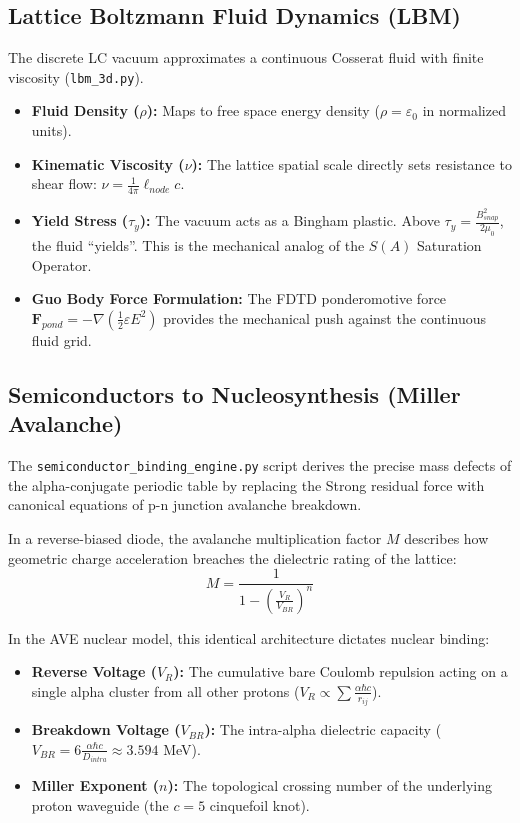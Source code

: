\subsection{Lattice Boltzmann Fluid Dynamics (LBM)}
\label{sec:ee_fluids}
The discrete LC vacuum approximates a continuous Cosserat fluid with finite viscosity (\texttt{lbm\_3d.py}).
\begin{itemize}
    \item \textbf{Fluid Density ($\rho$):} Maps to free space energy density ($\rho = \varepsilon_0$ in normalized units).
    \item \textbf{Kinematic Viscosity ($\nu$):} The lattice spatial scale directly sets resistance to shear flow: $\nu = \frac{1}{4\pi}\ell_{node}c$.
    \item \textbf{Yield Stress ($\tau_y$):} The vacuum acts as a Bingham plastic. Above $\tau_y = \frac{B_{snap}^2}{2\mu_0}$, the fluid ``yields''. This is the mechanical analog of the $S(A)$ Saturation Operator.
    \item \textbf{Guo Body Force Formulation:} The FDTD ponderomotive force $\mathbf{F}_{pond} = -\nabla (\frac{1}{2}\varepsilon E^2)$ provides the mechanical push against the continuous fluid grid.
\end{itemize}

\subsection{Semiconductors to Nucleosynthesis (Miller Avalanche)}
\label{sec:ee_semiconductor_nuclear}

The \texttt{semiconductor\_binding\_engine.py} script derives the precise mass defects of the alpha-conjugate periodic table by replacing the Strong residual force with canonical equations of p-n junction avalanche breakdown.

In a reverse-biased diode, the avalanche multiplication factor $M$ describes how geometric charge acceleration breaches the dielectric rating of the lattice:
\begin{equation}
    M = \frac{1}{1 - \left(\frac{V_R}{V_{BR}}\right)^n}
\end{equation}

In the AVE nuclear model, this identical architecture dictates nuclear binding:
\begin{itemize}
    \item \textbf{Reverse Voltage ($V_R$):} The cumulative bare Coulomb repulsion acting on a single alpha cluster from all other protons ($V_R \propto \sum \frac{\alpha\hbar c}{r_{ij}}$).
    \item \textbf{Breakdown Voltage ($V_{BR}$):} The intra-alpha dielectric capacity ($V_{BR} = 6 \frac{\alpha\hbar c}{D_{intra}} \approx 3.594$ MeV).
    \item \textbf{Miller Exponent ($n$):} The topological crossing number of the underlying proton waveguide (the $c = 5$ cinquefoil knot).
\end{itemize}

